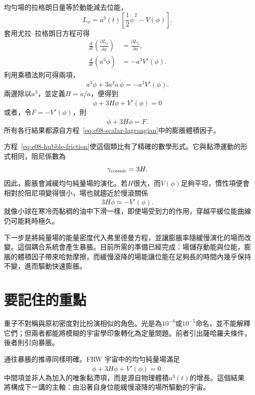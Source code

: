 均勻場的拉格朗日量等於動能減去位能，
\begin{equation}
L_\phi=a^3(t)
\left[
\frac12\dot\phi^{\,2}-V(\phi)
\right].
\label{eq:c08-scalar-lagrangian}
\end{equation}
套用尤拉--拉格朗日方程可得
\begin{align}
\frac{d}{dt}\left(\frac{\partial L_\phi}{\partial\dot\phi}\right)
&=
\frac{\partial L_\phi}{\partial\phi},\\
\frac{d}{dt}\left(a^3\dot\phi\right)
&=-a^3V'(\phi).
\end{align}
利用乘積法則可得兩項，
\begin{equation}
a^3\ddot\phi+3a^2\dot a\,\dot\phi
=-a^3V'(\phi).
\end{equation}
兩邊除以\(a^3\)，並定義\(H=\dot a/a\)，便得到
\begin{equation}
\boxed{
\ddot\phi+3H\dot\phi+V'(\phi)=0
}
\label{eq:c08-hubble-friction}
\end{equation}
或者，令\(F=-V'(\phi)\)，則
\begin{equation}
\ddot\phi+3H\dot\phi=F.
\end{equation}
所有各行結果都源自方程~\eqref{eq:c08-scalar-lagrangian}中的膨脹體積因子。

\begin{classroomqa}
\end{classroomqa}

方程~\eqref{eq:c08-hubble-friction}使這個類比有了精確的數學形式。它與黏滯運動的形式相同，阻尼係數為
\begin{equation}
\gamma_{\rm cosmic}=3H.
\end{equation}
因此，膨脹會減緩均勻純量場的演化。若\(H\)很大，而\(V(\phi)\)足夠平坦，慣性項便會相對於阻尼項變得很小，場也就趨近於慢滾關係
\begin{equation}
3H\dot\phi\simeq-V'(\phi).
\end{equation}
就像小球在寒冷而黏稠的油中下滑一樣，即使場受到力的作用，穿越平緩位能曲線仍可能耗時極久。

下一步是將純量場的能量密度代入弗里德曼方程，並讓膨脹率隨緩慢演化的場而改變。這個耦合系統會產生暴脹。目前所需的準備已經完成：場儲存動能與位能，膨脹的體積因子帶來哈勃摩擦，而緩慢滾降的場能讓位能在足夠長的時間內幾乎保持不變，進而驅動快速膨脹。

\section{要記住的重點}

重子不對稱與原初密度對比扮演相似的角色。光是為\(10^{-8}\)或\(10^{-5}\)命名，並不能解釋它們；但兩者都能將模糊的宇宙學印象轉化為定量問題。前者引出薩哈羅夫條件，後者則引向暴脹。

通往暴脹的推導同樣明確。FRW 宇宙中的均勻純量場滿足
\[
\ddot\phi+3H\dot\phi+V'(\phi)=0.
\]
中間項並非人為加入的唯象黏滯項，而是源自物理體積\(a^3(t)\)的增長。這個結果將構成下一講的主軸：由沿著自身位能緩慢滾降的場所驅動的宇宙。